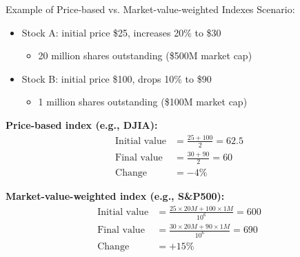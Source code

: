 \documentclass[10pt,handout]{beamer}
\begin{document}
\begin{frame}{Example of Price-based vs. Market-value-weighted Indexes}
  Scenario:
  \begin{itemize}
    \item Stock A: initial price \$25, increases 20\% to \$30
      \begin{itemize}
        \item 20 million shares outstanding (\$500M market cap)
      \end{itemize}
    \item Stock B: initial price \$100, drops 10\% to \$90
      \begin{itemize}
        \item 1 million shares outstanding (\$100M market cap)
      \end{itemize}
  \end{itemize}
  
  \pause
  \textbf{Price-based index (e.g., DJIA):}
  \begin{align*}
    \text{Initial value} &= \tfrac{25 + 100}{2} = 62.5\\
    \text{Final value} &= \tfrac{30 + 90}{2} = 60\\
    \text{Change} &= -4\%
  \end{align*}
  
  \pause
  \textbf{Market-value-weighted index (e.g., S\&P500):}
  \begin{align*}
    \text{Initial value} &= \tfrac{25 \times 20M + 100 \times 1M}{10^6} = 600\\
    \text{Final value} &= \tfrac{30 \times 20M + 90 \times 1M}{10^6} = 690\\
    \text{Change} &= +15\%
  \end{align*}
\end{frame}
\end{document}
